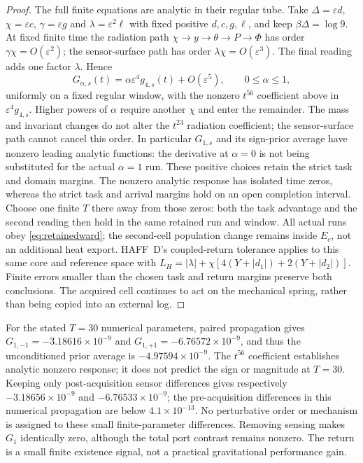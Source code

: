 \documentclass[12pt]{article}
\theoremstyle{definition}
\theoremstyle{remark}
\begin{document}
\begin{proof}
The full finite equations are analytic in their regular tube.
Take $\Delta=\varepsilon d$, $\chi=\varepsilon c$,
$\gamma=\varepsilon g$ and $\lambda=\varepsilon^2\ell$ with
fixed positive $d,c,g,\ell$, and keep $\beta\Delta=\log9$.
At fixed finite time the radiation path $\chi\to y\to\theta
\to P\to\Phi$ has order $\gamma\chi=O(\varepsilon^2)$;
the sensor-surface path has order $\lambda\chi=O(\varepsilon^3)$.
The final reading adds one factor $\lambda$. Hence
\[
 G_{\alpha,s}(t)=\alpha\varepsilon^4g_{4,s}(t)
                      +O(\varepsilon^5),\qquad0\le\alpha\le1,
\]
uniformly on a fixed regular window, with the nonzero $t^{56}$
coefficient above in $\varepsilon^4g_{4,s}$.
Higher powers of $\alpha$ require another $\chi$ and enter the
remainder. The mass and invariant changes do not alter the
$t^{23}$ radiation coefficient; the sensor-surface path cannot
cancel this order. In particular $G_{1,s}$ and its sign-prior average
have nonzero leading analytic functions: the derivative at
$\alpha=0$ is not being substituted for the actual $\alpha=1$ run.
These positive choices retain the strict task and domain margins.
The nonzero analytic
response has isolated time zeros, whereas the strict task and arrival
margins hold on an open completion interval. Choose one finite $T$
there away from those zeros: both the task advantage and the second
reading then hold in the same retained run and window.
All actual runs obey \eqref{eq:retainedward}; the second-cell
population change remains inside $E_c$, not an additional heat
export. HAFF~D's coupled-return tolerance applies to this same core and
reference space with
$L_H=|\lambda|+\chi[4(Y+|d_1|)+2(Y+|d_2|)]$.
Finite errors smaller than the chosen task and return margins preserve
both conclusions. The acquired cell continues to act on the mechanical
spring, rather than being copied into an external log.
\end{proof}

For the stated $T=30$ numerical parameters, paired propagation gives
$G_{1,-1}=-3.18616\times10^{-9}$ and
$G_{1,+1}=-6.76572\times10^{-9}$, and thus the unconditioned
prior average is $-4.97594\times10^{-9}$. The $t^{56}$ coefficient
establishes analytic nonzero response; it does not predict the sign or
magnitude at $T=30$.
Keeping only post-acquisition sensor differences gives respectively
$-3.18656\times10^{-9}$ and $-6.76533\times10^{-9}$;
the pre-acquisition differences in this numerical propagation are below
$4.1\times10^{-13}$. No perturbative order or mechanism is assigned to
these small finite-parameter differences.
Removing sensing makes $G_1$ identically zero, although the total
port contrast remains nonzero. The return is a small finite
existence signal, not a practical gravitational performance gain.
\end{document}
